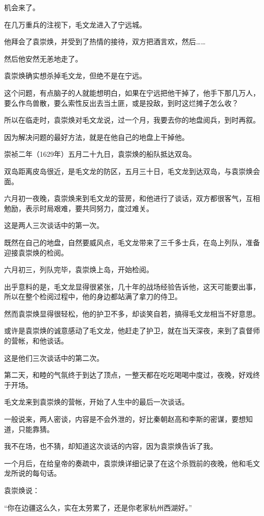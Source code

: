 \begin{multicols}{\theparacolNo}
机会来了。

在几万重兵的注视下，毛文龙进入了宁远城。

他拜会了袁崇焕，并受到了热情的接待，双方把酒言欢，然后……

然后他安然无恙地走了。

袁崇焕确实想杀掉毛文龙，但绝不是在宁远。

这个问题，有点脑子的人就能想明白，如果在宁远把他干掉了，他手下那几万人，要么作鸟兽散，要么索性反出去当土匪，或是投敌，到时这烂摊子怎么收？

所以在临走时，袁崇焕对毛文龙说，过一个月，我要去你的地盘阅兵，到时再叙。

因为解决问题的最好方法，就是在他自己的地盘上干掉他。

崇祯二年（1629年）五月二十九日，袁崇焕的船队抵达双岛。

双岛距离皮岛很近，是毛文龙的防区，五月三十日，毛文龙到达双岛，与袁崇焕会面。

六月初一夜晚，袁崇焕来到毛文龙的营房，和他进行了谈话，双方都很客气，互相勉励，表示时局艰难，要共同努力，度过难关。

这是两人三次谈话中的第一次。

既然在自己的地盘，自然要威风点，毛文龙带来了三千多士兵，在岛上列队，准备迎接袁崇焕的检阅。

六月初三，列队完毕，袁崇焕上岛，开始检阅。

出乎意料的是，毛文龙显得很紧张，几十年的战场经验告诉他，这天可能要出事，所以在整个检阅过程中，他的身边都站满了拿刀的侍卫。

然而袁崇焕显得很轻松，他的护卫不多，却谈笑自若，搞得毛文龙相当不好意思。

或许是袁崇焕的诚意感动了毛文龙，他赶走了护卫，就在当天深夜，来到了袁督师的营帐，和他谈话。

这是他们三次谈话中的第二次。

第二天，和睦的气氛终于到达了顶点，一整天都在吃吃喝喝中度过，夜晚，好戏终于开场。

毛文龙来到袁崇焕的营帐，开始了人生中的最后一次谈话。

一般说来，两人密谈，内容是不会外泄的，好比秦朝赵高和李斯的密谋，要想知道，只能靠猜。

我不在场，也不猜，却知道这次谈话的内容，因为袁崇焕告诉了我。

一个月后，在给皇帝的奏疏中，袁崇焕详细记录了在这个杀戮前的夜晚，他和毛文龙所说的每句话。

袁崇焕说：

“你在边疆这么久，实在太劳累了，还是你老家杭州西湖好。”


\end{multicols}
